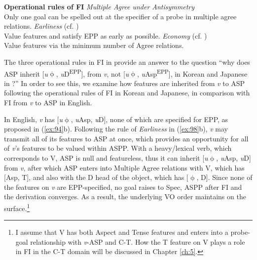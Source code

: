 \ex\label{ex:98} \textbf{Operational rules of \acl{FI}}
    \ea \textit{Multiple Agree under Antisymmetry} \\
Only one goal can be spelled out at the specifier of a probe in multiple agree relations.
    \ex \textit{Earliness} (cf. \citealt{Pesetsky1989}) \\
    Value features and satisfy \ac{EPP} as early as possible. 
    \ex \textit{Economy} (cf. \citealt{PesetskyTorrego2001})\footnotemark \\
     Value features via the minimum number of Agree relations.
    \z
\z


The three operational rules in \ac{FI} in  provide an answer to the question ``why does \ac{ASP} inherit [\textit{u}$\upphi$, \textit{u}D\textsuperscript{\ac{EPP}}], from \textit{v}, not [\textit{u}$\upphi$, \textit{u}Asp\textsuperscript{\ac{EPP}}], in Korean and Japanese in ?'' In order to see this, we examine how features are inherited from \textit{v} to \ac{ASP} following the operational rules of \ac{FI} in Korean and Japanese, in comparison with \ac{FI} from \textit{v} to \ac{ASP} in English. 

In English, \textit{v} has [\textit{u}$\upphi$, \textit{u}Asp, \textit{u}D], none of which are specified for \ac{EPP}, as proposed in (\ref{ex:94}b). Following the rule of \textit{Earliness} in (\ref{ex:98}b), \textit{v} may transmit all of its features to \ac{ASP} at once, which provides an opportunity for all of \textit{v}’s features to be valued within \ac{ASP}P. With a heavy/lexical verb, which corresponds to V, \ac{ASP} is null and featureless, thus it can inherit [\textit{u}$\upphi$, \textit{u}Asp, \textit{u}D] from \textit{v}, after which \ac{ASP} enters into Multiple Agree relations with V, which has [Asp, T], and also with the D head of the object, which has [$\upphi$, D]. Since none of the features on \textit{v} are \ac{EPP}-specified, no goal raises to Spec, \ac{ASP}P after \ac{FI} and the derivation converges. As a result, the underlying \ac{VO} order maintains on the surface.\footnote{I assume that V has both Aspect and Tense features and enters into a probe-goal relationship with \textit{v}-\ac{ASP} and C-T. How the T feature on V plays a role in \ac{FI} in the C-T domain will be discussed in Chapter \ref{ch:5}.}

